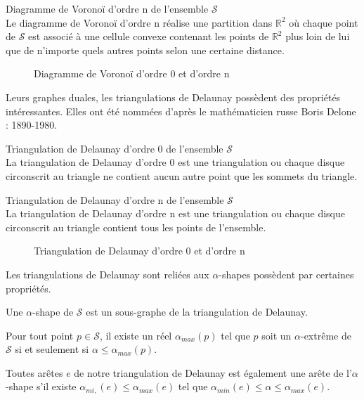  \begin{Definition}{Diagramme de Voronoï d'ordre n de l'ensemble $\mathcal{S}$}\\
\label{def:tri-vor-n}
   Le diagramme de Voronoï d'ordre n réalise une partition dans $\mathbb{R}^2$ où chaque point de $\mathcal{S}$ est associé à une cellule convexe contenant les points de $\mathbb{R}^2$ plus loin de lui que de n'importe quels autres points selon une certaine distance.
\end{Definition}

\begin{figure}[H]
  \centering
  \caption{Diagramme de Voronoï d'ordre 0 et d'ordre n}
\end{figure}

Leurs graphes duales, les triangulations de Delaunay possèdent des propriétés intéressantes.  Elles ont été nommées d'après le mathématicien russe Boris Delone : 1890-1980.

\begin{Definition}{Triangulation de Delaunay d'ordre 0 de l'ensemble $\mathcal{S}$}\\
\label{def:tri-del-0}
  La triangulation de Delaunay d'ordre 0 est une triangulation ou chaque disque circonscrit au triangle ne contient aucun autre point que les sommets du triangle.
\end{Definition}

\begin{Definition}{Triangulation de Delaunay d'ordre n de l'ensemble $\mathcal{S}$}\\
\label{def:tri-del-n}
  La triangulation de Delaunay d'ordre n est une triangulation ou chaque disque circonscrit au triangle contient tous les points de l'ensemble.
\end{Definition}

\begin{figure}[H]
  \centering
  \caption{Triangulation de Delaunay d'ordre 0 et d'ordre n}
\end{figure}


Les triangulations de Delaunay sont reliées aux $\alpha$-shapes possèdent par certaines propriétés. \cite{EdeKirSei83}

\begin{Lemma}
  Une $\alpha$-shape de $\mathcal{S}$ est un sous-graphe de la triangulation de Delaunay.
\end{Lemma}

\begin{Lemma}
  Pour tout point $p \in \mathcal{S}$, il existe un réel $\alpha_{max}(p)$ tel que $p$ soit un $\alpha$-extrême de $\mathcal{S}$ si et seulement si $\alpha \leq \alpha_{max}(p)$.
\end{Lemma}

\begin{Lemma}
  Toutes arêtes $e$ de notre triangulation de Delaunay est également une arête de l'$\alpha$-shape s'il existe $\alpha_{mi,}(e) \leq \alpha_{max}(e)$ tel que $\alpha_{min}(e) \leq \alpha \leq \alpha_{max}(e)$.
\end{Lemma}
